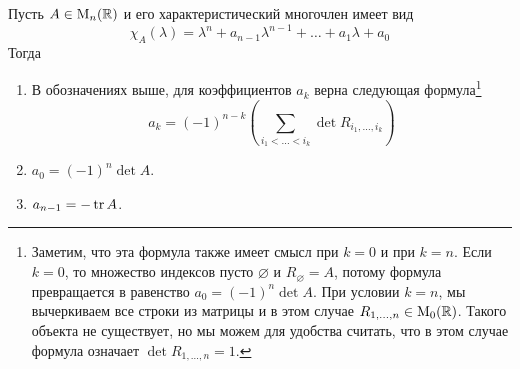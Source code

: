 \begin{claim}
Пусть $A\in\operatorname{M}_{n}(\mathbb R)$ и его характеристический многочлен имеет вид 
\[
\chi_A(\lambda) = \lambda^n + a_{n-1}\lambda^{n-1} + \ldots + a_1 \lambda + a_0
\]
Тогда
\begin{enumerate}
\item В обозначениях выше, для коэффициентов $a_k$ верна следующая формула\footnote{Заметим, что эта формула также имеет смысл при $k=0$ и при $k = n$. Если $k = 0$, то множество индексов пусто $\varnothing$ и $R_\varnothing = A$, потому формула превращается в равенство $a_0 = (-1)^n\det A$. При условии $ k = n$, мы вычеркиваем все строки из матрицы и в этом случае $R_{1,\ldots,n}\in\operatorname{M}_{0}(\mathbb R)$. Такого объекта не существует, но мы можем для удобства считать, что в этом случае формула означает $\det R_{1,\ldots,n} = 1$.}
\[
a_{k} = (-1)^{n-k}\left(\sum_{i_1<\ldots<i_k}\det R_{i_1,\ldots,i_k}\right)
\]
\item $a_0 = (-1)^n\det A$.
\item $a_{n-1} =  - \operatorname{tr} A$.
\end{enumerate}
\end{claim}
